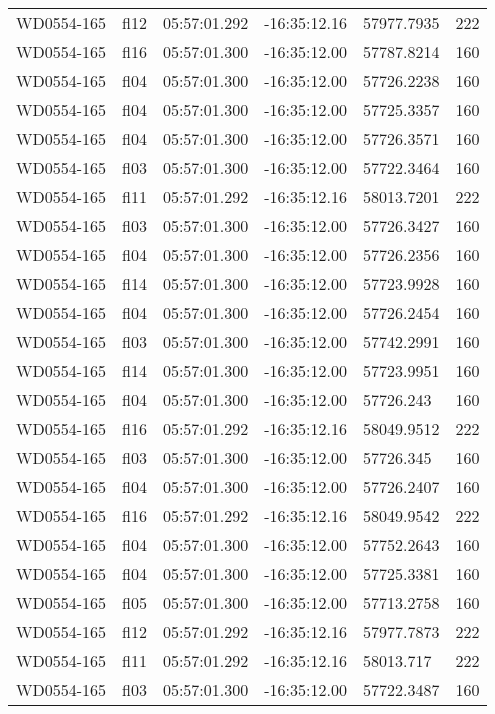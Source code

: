 \begin{table}[]
\begin{tabular}{llllll}
WD0554-165 & fl12 & 05:57:01.292 & -16:35:12.16 & 57977.7935 & 222 \\ 
WD0554-165 & fl16 & 05:57:01.300 & -16:35:12.00 & 57787.8214 & 160 \\ 
WD0554-165 & fl04 & 05:57:01.300 & -16:35:12.00 & 57726.2238 & 160 \\ 
WD0554-165 & fl04 & 05:57:01.300 & -16:35:12.00 & 57725.3357 & 160 \\ 
WD0554-165 & fl04 & 05:57:01.300 & -16:35:12.00 & 57726.3571 & 160 \\ 
WD0554-165 & fl03 & 05:57:01.300 & -16:35:12.00 & 57722.3464 & 160 \\ 
WD0554-165 & fl11 & 05:57:01.292 & -16:35:12.16 & 58013.7201 & 222 \\ 
WD0554-165 & fl03 & 05:57:01.300 & -16:35:12.00 & 57726.3427 & 160 \\ 
WD0554-165 & fl04 & 05:57:01.300 & -16:35:12.00 & 57726.2356 & 160 \\ 
WD0554-165 & fl14 & 05:57:01.300 & -16:35:12.00 & 57723.9928 & 160 \\ 
WD0554-165 & fl04 & 05:57:01.300 & -16:35:12.00 & 57726.2454 & 160 \\ 
WD0554-165 & fl03 & 05:57:01.300 & -16:35:12.00 & 57742.2991 & 160 \\ 
WD0554-165 & fl14 & 05:57:01.300 & -16:35:12.00 & 57723.9951 & 160 \\ 
WD0554-165 & fl04 & 05:57:01.300 & -16:35:12.00 & 57726.243 & 160 \\ 
WD0554-165 & fl16 & 05:57:01.292 & -16:35:12.16 & 58049.9512 & 222 \\ 
WD0554-165 & fl03 & 05:57:01.300 & -16:35:12.00 & 57726.345 & 160 \\ 
WD0554-165 & fl04 & 05:57:01.300 & -16:35:12.00 & 57726.2407 & 160 \\ 
WD0554-165 & fl16 & 05:57:01.292 & -16:35:12.16 & 58049.9542 & 222 \\ 
WD0554-165 & fl04 & 05:57:01.300 & -16:35:12.00 & 57752.2643 & 160 \\ 
WD0554-165 & fl04 & 05:57:01.300 & -16:35:12.00 & 57725.3381 & 160 \\ 
WD0554-165 & fl05 & 05:57:01.300 & -16:35:12.00 & 57713.2758 & 160 \\ 
WD0554-165 & fl12 & 05:57:01.292 & -16:35:12.16 & 57977.7873 & 222 \\ 
WD0554-165 & fl11 & 05:57:01.292 & -16:35:12.16 & 58013.717 & 222 \\ 
WD0554-165 & fl03 & 05:57:01.300 & -16:35:12.00 & 57722.3487 & 160 \\ 

\end{tabular}
\end{table}
